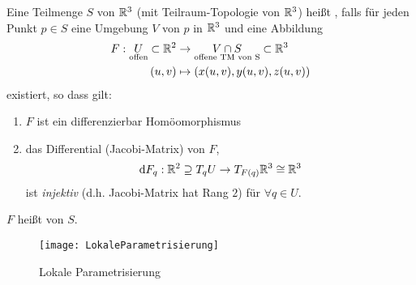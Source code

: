 \begin{definition}
  Eine Teilmenge \( S \) von \( \mathbb{R}^3 \) (mit Teilraum-Topologie von \( \mathbb{R}^3 \)) heißt \label{def:regulaereFlaeche}, falls für jeden Punkt \( p \in S \) eine Umgebung \( V \) von \( p \) in \( \mathbb{R}^3 \) und eine Abbildung
  \begin{align*}
    F : \underset{\text{offen}}{U} \subset \mathbb{R}^2 &\to \underset{\text{offene TM von S}}{V \cap S} \subset \mathbb{R}^3 \\
      (u,v) &\mapsto (x(u,v),y(u,v),z(u,v))
  \end{align*}
  existiert, so dass gilt:
  \begin{enumerate}
    \item \( F \) ist ein differenzierbar Homöomorphismus
    \item das Differential (Jacobi-Matrix) von \( F \),
    \begin{equation*}
       \text{d}F_q : \mathbb{R}^2 \supseteq T_q U \to T_{F(q)}\mathbb{R}^3 \cong \mathbb{R}^3
     \end{equation*} 
     ist \emph{injektiv} (d.h. Jacobi-Matrix hat Rang \( 2 \)) für \( \forall q \in U \).
  \end{enumerate}
  \( F \) heißt \label{def:lokaleParametrisierung} von \( S \).
  \begin{figure}[H]
    \texttt{[image: LokaleParametrisierung]}
    \caption{Lokale Parametrisierung}
  \end{figure}
\end{definition}


